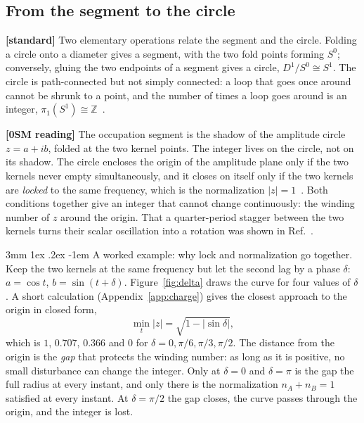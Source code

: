 \documentclass[%
 reprint, amsmath,amssymb, aps, prb, ]{revtex4-2}
\makeatletter
\numberwithin{equation}{section}
\renewcommand\paragraph{%
  \@startsection{paragraph}{4}{\z@}%
    {3mm \@plus 1ex \@minus .2ex}
    {-1em}
    {\normalfont\normalsize\itshape}}
\makeatother
\begin{document}
\subsection{From the segment to the circle}

\textbf{[standard]} Two elementary operations relate the segment and the circle. Folding a circle onto a diameter gives a segment, with the two fold points forming $S^0$; conversely, gluing the two endpoints of a segment gives a circle, $D^1/S^0\cong S^1$. The circle is path-connected but not simply connected: a loop that goes once around cannot be shrunk to a point, and the number of times a loop goes around is an integer, $\pi_1(S^1)\cong\mathbb{Z}$~\cite{ref:hatcher,ref:nakahara}.

\textbf{[0SM reading]} The occupation segment is the shadow of the amplitude circle $z=a+ib$, folded at the two kernel points. The integer lives on the circle, not on its shadow. The circle encloses the origin of the amplitude plane only if the two kernels never empty simultaneously, and it closes on itself only if the two kernels are \emph{locked} to the same frequency, which is the normalization $|z|=1$~\cite{ref:p1,ref:p20}. Both conditions together give an integer that cannot change continuously: the winding number of $z$ around the origin. That a quarter-period stagger between the two kernels turns their scalar oscillation into a rotation was shown in Ref.~\cite{ref:p50}.

\paragraph{A worked example: why lock and normalization go together.} Keep the two kernels at the same frequency but let the second lag by a phase $\delta$: $a=\cos t$, $b=\sin(t+\delta)$. Figure~\ref{fig:delta} draws the curve for four values of $\delta$. A short calculation (Appendix~\ref{app:charge}) gives the closest approach to the origin in closed form,
\begin{equation}
\min_t|z|=\sqrt{1-|\sin\delta|},
\label{eq:gap}
\end{equation}
which is $1$, $0.707$, $0.366$ and $0$ for $\delta=0,\pi/6,\pi/3,\pi/2$. The distance from the origin is the \emph{gap} that protects the winding number: as long as it is positive, no small disturbance can change the integer. Only at $\delta=0$ and $\delta=\pi$ is the gap the full radius at every instant, and only there is the normalization $n_A+n_B=1$ satisfied at every instant. At $\delta=\pi/2$ the gap closes, the curve passes through the origin, and the integer is lost.
\end{document}
